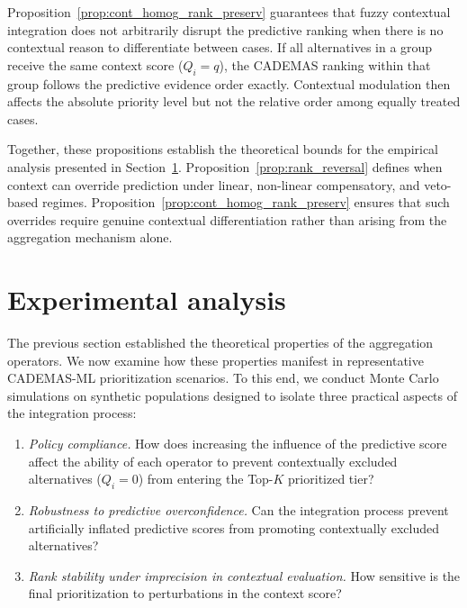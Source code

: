 \documentclass[mathematics,article,submit,moreauthors]{Definitions/mdpi}
\begin{document}
Proposition~\ref{prop:cont_homog_rank_preserv} guarantees that fuzzy contextual integration does not arbitrarily disrupt the predictive ranking when there is no contextual reason to differentiate between cases. If all alternatives in a group receive the same context score ($Q_i = q$), the CADEMAS ranking within that group follows the predictive evidence order exactly. Contextual modulation then affects the absolute priority level but not the relative order among equally treated cases.

Together, these propositions establish the theoretical bounds for the empirical analysis presented in Section~\ref{sect:simulation}. Proposition~\ref{prop:rank_reversal} defines when context can override prediction under linear, non-linear compensatory, and veto-based regimes. Proposition~\ref{prop:cont_homog_rank_preserv} ensures that such overrides require genuine contextual differentiation rather than arising from the aggregation mechanism alone. 

\section{Experimental analysis}\label{sect:simulation}

The previous section established the theoretical properties of the aggregation operators. We now examine how these properties manifest in representative CADEMAS-ML prioritization scenarios. To this end, we conduct Monte Carlo simulations on synthetic populations designed to isolate three practical aspects of the integration process:

\begin{enumerate}

\item \emph{Policy compliance.} How does increasing the influence of the predictive score affect the ability of each operator to prevent contextually excluded alternatives ($Q_i=0$) from entering the Top-$K$ prioritized tier?

\item \emph{Robustness to predictive overconfidence.} Can the integration process prevent artificially inflated predictive scores from promoting contextually excluded alternatives?

\item \emph{Rank stability under imprecision in contextual evaluation.} How sensitive is the final prioritization to perturbations in the context score?

\end{enumerate}
\end{document}
